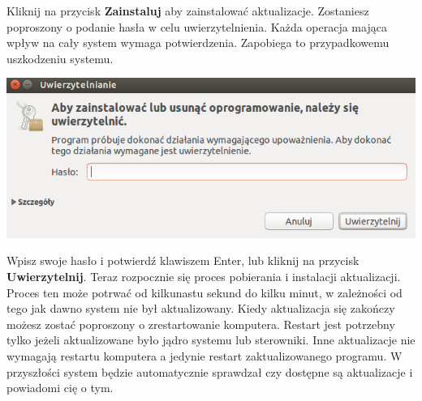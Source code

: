 Kliknij na przycisk \textbf{Zainstaluj} aby zainstalować aktualizacje. Zostaniesz poproszony o podanie hasła w celu uwierzytelnienia. Każda operacja mająca wpływ na cały system wymaga potwierdzenia. Zapobiega to przypadkowemu uszkodzeniu systemu.
\begin{center}
        \includegraphics{images/unity_uwierzytelnienie.png}
\end{center}
Wpisz swoje hasło i potwierdź klawiszem Enter, lub kliknij na przycisk \textbf{Uwierzytelnij}. Teraz rozpocznie się proces pobierania i instalacji aktualizacji. Proces ten może potrwać od kilkunastu sekund do kilku minut, w zależności od tego jak dawno system nie był aktualizowany.
Kiedy aktualizacja się zakończy możesz zostać poproszony o zrestartowanie komputera. Restart jest potrzebny tylko jeżeli aktualizowane było jądro systemu lub sterowniki. Inne aktualizacje nie wymagają restartu komputera a jedynie restart zaktualizowanego programu.
W przyszłości system będzie automatycznie sprawdzał czy dostępne są aktualizacje i powiadomi cię o tym.
\clearpage
